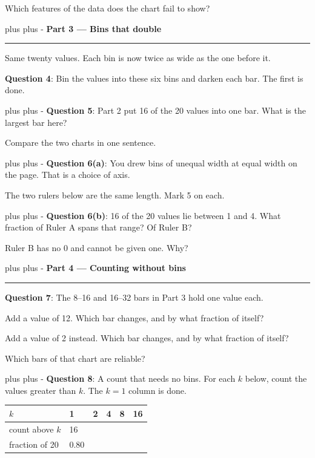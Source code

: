 \documentclass[a4paper, 14pt]{extarticle}
\newcommand{\needroom}[1]{%
  \par
  \begingroup
    \setlength{\dimen0}{#1}%
    \vskip 0pt plus \dimen0
    \penalty -100%
    \vskip 0pt plus -\dimen0
  \endgroup}
\newcommand{\parthead}[2]{%
  \needroom{6\baselineskip}%
  \partheadhere{#1}{#2}}
\newcommand{\partheadhere}[2]{%
  \vspace{0.5em}
  {\large\bfseries Part #1 --- #2}\par
  \vspace{-0.4em}\rule{\textwidth}{0.8pt}\par
  \vspace{0.1em}}
\begin{document}
Which features of the data does the chart fail to show?

\parthead{3}{Bins that double}

Same twenty values. Each bin is now twice as wide as the one before it.

{\bf Question 4}: Bin the values into these six bins and darken each bar. The
first is done.

\vspace{0.3em}
\begin{center}
\end{center}

\needroom{4\baselineskip}%
{\bf Question 5}: Part 2 put 16 of the 20 values into one bar. What is the
largest bar here?

Compare the two charts in one sentence.

\needroom{6\baselineskip}%
{\bf Question 6(a)}: You drew bins of unequal width at equal width on the page.
That is a choice of axis.

The two rulers below are the same length. Mark 5 on each.

\vspace{0.4em}
\begin{center}
\end{center}
\vspace{0.4em}

\needroom{5\baselineskip}%
{\bf Question 6(b)}: 16 of the 20 values lie between 1 and 4. What fraction of
Ruler A spans that range? Of Ruler B?

Ruler B has no 0 and cannot be given one. Why?

\parthead{4}{Counting without bins}

{\bf Question 7}: The 8--16 and 16--32 bars in Part 3 hold one value each.

Add a value of 12. Which bar changes, and by what fraction of itself?

Add a value of 2 instead. Which bar changes, and by what fraction of itself?

Which bars of that chart are reliable?

\needroom{7\baselineskip}%
{\bf Question 8}: A count that needs no bins. For each $k$ below, count the
values greater than $k$. The $k = 1$ column is done.

\begin{center}
{\setlength{\tabcolsep}{6pt}\renewcommand{\arraystretch}{1.35}
\begin{tabular}{|l|C{1.7cm}|C{1.7cm}|C{1.7cm}|C{1.7cm}|C{1.7cm}|}
\hline
$k$ & 1 & 2 & 4 & 8 & 16 \\
\hline
count above $k$ & 16 & & & & \\
\hline
fraction of 20 & 0.80 & & & & \\
\hline
\end{tabular}}
\end{center}
\end{document}
